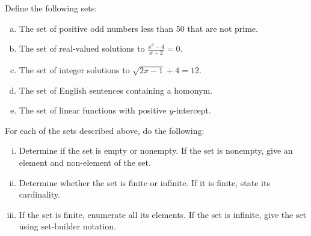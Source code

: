 \documentclass[11pt,letterpaper]{article}
\begin{document}

 Define the following sets:
        \begin{enumerate}[(a)]
        \item The set of positive odd numbers less than 50 that are not prime. 
        \item The set of real-valued solutions to $\frac{x^2 - 4}{x + 2}= 0$.
        \item The set of integer solutions to $\sqrt{2x - 1} + 4= 12$. 
        \item The set of English sentences containing a homonym. 
        \item The set of linear functions with positive $y$-intercept. 
        \end{enumerate}
For each of the sets described above, do the following:
	\begin{enumerate}[(i)]
	\item Determine if the set is empty or nonempty. If the set is nonempty, give an element and non-element of the set.	
	\item Determine whether the set is finite or infinite. If it is finite, state its cardinality. 
	\item If the set is finite, enumerate all its elements. If the set is infinite, give the set using set-builder notation. 
	\end{enumerate} \pspace
\end{document}
